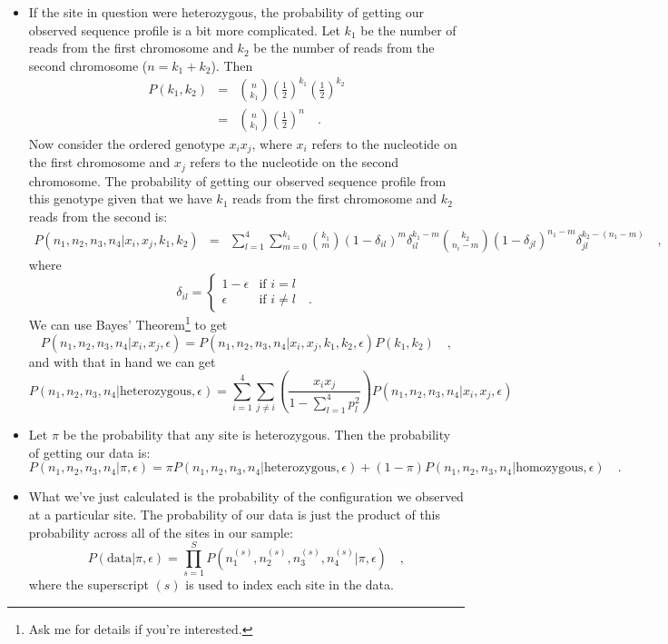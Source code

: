\begin{itemize}
\item If the site in question were heterozygous, the probability of
  getting our observed sequence profile is a bit more complicated. Let
  $k_1$ be the number of reads from the first chromosome and $k_2$ be
  the number of reads from the second chromosome ($n=k_1+k_2$). Then
\begin{eqnarray*}
P(k_1,k_2)
&=&
{n \choose k_1}\left(\frac{1}{2}\right)^{k_1}
               \left(\frac{1}{2}\right)^{k_2}
\\
&=&
{n \choose k_1}\left(\frac{1}{2}\right)^n \quad .
\end{eqnarray*}
Now consider the ordered genotype $x_ix_j$, where $x_i$ refers to the
nucleotide on the first chromosome and $x_j$ refers to the nucleotide
on the second chromosome. The probability of getting our observed
sequence profile from this genotype given that we have $k_1$ reads
from the first chromosome and $k_2$ reads from the second is:
{\footnotesize
\begin{eqnarray*}
P(n_1,n_2,n_3,n_4|x_i,x_j,k_1,k_2)
&=&
\sum_{l=1}^4\sum_{m=0}^{k_1}{k_1 \choose m}(1-\delta_{il})^m\delta_{il}^{k_1-m}
{k_2 \choose n_i-m}(1-\delta_{jl})^{n_1-m}\delta_{jl}^{k_2-(n_1-m)}
\quad ,
\end{eqnarray*}
}
where 
\[
\delta_{il} = \left\{\begin{array}{ll}
1-\epsilon & \mbox{if } i = l \\
\epsilon & \mbox{if } i \ne l \quad .
\end{array}
\right.
\]
We can use Bayes' Theorem\footnote{Ask me for details if you're
  interested.} to get
\[
P(n_1,n_2,n_3,n_4|x_i,x_j,\epsilon) =
P(n_1,n_2,n_3,n_4|x_i,x_j,k_1,k_2,\epsilon)P(k_1,k_2) \quad ,
\]
and with that in hand we can get
\[
P(n_1,n_2,n_3,n_4|\mbox{heterozygous},\epsilon)
=
\sum_{i=1}^4\sum_{j\ne i}
\left(\frac{x_ix_j}{1-{\sum_{l=1}^4p_l^2}}\right) P(n_1,n_2,n_3,n_4|x_i,x_j,\epsilon) 
\]

\item Let $\pi$ be the probability that any site is heterozygous. Then
  the probability of getting our data is:
{\footnotesize
\[
P(n_1,n_2,n_3,n_4|\pi,\epsilon)
=
\pi P(n_1,n_2,n_3,n_4|\mbox{heterozygous},\epsilon)
+
(1-\pi)P(n_1,n_2,n_3,n_4|\mbox{homozygous},\epsilon) \quad .
\]
}

\item What we've just calculated is the probability of the
  configuration we observed at a particular site. The probability of
  our data is just the product of this probability across all of the
  sites in our sample:
\[
P(\mbox{data}|\pi,\epsilon) = \prod_{s=1}^S
P(n_1^{(s)},n_2^{(s)},n_3^{(s)},n_4^{(s)}|\pi,\epsilon) \quad ,
\]
where the superscript $(s)$ is used to index each site in the data.


\end{itemize}
